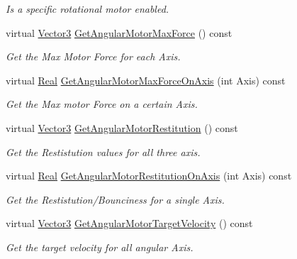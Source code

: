 \begin{DoxyCompactItemize}
\begin{DoxyCompactList}\small\item\em Is a specific rotational motor enabled. \item\end{DoxyCompactList}\item 
virtual \hyperlink{classphys_1_1Vector3}{Vector3} \hyperlink{classphys_1_1Generic6DofConstraint_a7a5626c95ed7921c88e328e6bdaeb35a}{GetAngularMotorMaxForce} () const 
\begin{DoxyCompactList}\small\item\em Get the Max Motor Force for each Axis. \item\end{DoxyCompactList}\item 
virtual \hyperlink{namespacephys_af7eb897198d265b8e868f45240230d5f}{Real} \hyperlink{classphys_1_1Generic6DofConstraint_a4db4caa07c84b0b3fa486d6c1e879ab0}{GetAngularMotorMaxForceOnAxis} (int Axis) const 
\begin{DoxyCompactList}\small\item\em Get the Max motor Force on a certain Axis. \item\end{DoxyCompactList}\item 
virtual \hyperlink{classphys_1_1Vector3}{Vector3} \hyperlink{classphys_1_1Generic6DofConstraint_a01103af5faf55c402da9f89eeabc506d}{GetAngularMotorRestitution} () const 
\begin{DoxyCompactList}\small\item\em Get the Restistution values for all three axis. \item\end{DoxyCompactList}\item 
virtual \hyperlink{namespacephys_af7eb897198d265b8e868f45240230d5f}{Real} \hyperlink{classphys_1_1Generic6DofConstraint_a44d868a63115921d40f4d8029d194199}{GetAngularMotorRestitutionOnAxis} (int Axis) const 
\begin{DoxyCompactList}\small\item\em Get the Restistution/Bounciness for a single Axis. \item\end{DoxyCompactList}\item 
virtual \hyperlink{classphys_1_1Vector3}{Vector3} \hyperlink{classphys_1_1Generic6DofConstraint_aa1a494e752d98209b95df3bed8126dee}{GetAngularMotorTargetVelocity} () const 
\begin{DoxyCompactList}\small\item\em Get the target velocity for all angular Axis. \item\end{DoxyCompactList}\item 

\end{DoxyCompactItemize}
